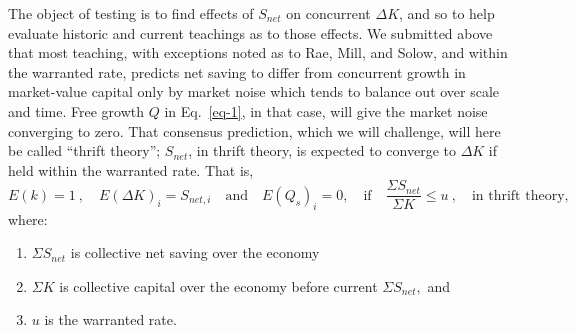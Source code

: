 \documentclass[a4paper,fleqn]{latex_styles/cas-sc}
\begin{document}
The object of testing is to find effects of \(S_{net}\) on concurrent
\(\Delta K\), and so to help evaluate historic and current teachings as
to those effects. We submitted above that most teaching, with exceptions
noted as to Rae, Mill, and Solow, and within the warranted rate,
predicts net saving to differ from concurrent growth in market-value
capital only by market noise which tends to balance out over scale and
time. Free growth \(Q\) in Eq.~\eqref{eq-1}, in that case, will give
the market noise converging to zero. That consensus prediction, which we
will challenge, will here be called ``thrift theory''; \(S_{net}\), in
thrift theory, is expected to converge to \(\Delta K\) if held within
the warranted rate. That is,
%
\begin{equation}
    E(k) = 1\ , \quad E(\Delta K)_{i} = S_{net, i} \quad \text{and} \quad E(Q_s)_i = 0,
\quad \text{if} \quad
\frac{\Sigma S_{net}}{\Sigma K} \leq u\ ,\quad \text{in thrift theory,}
\label{eq-2}
\end{equation}
%
where:

\begin{enumerate}
\def\labelenumi{\arabic{enumi}.}
\item
  \(\Sigma S_{net}\) is collective net saving over the economy
\item
  \(\Sigma K\) is collective capital over the economy before current
  \(\Sigma S_{net},\) and
\item
  \(u\) is the warranted rate.
\end{enumerate}
\end{document}
